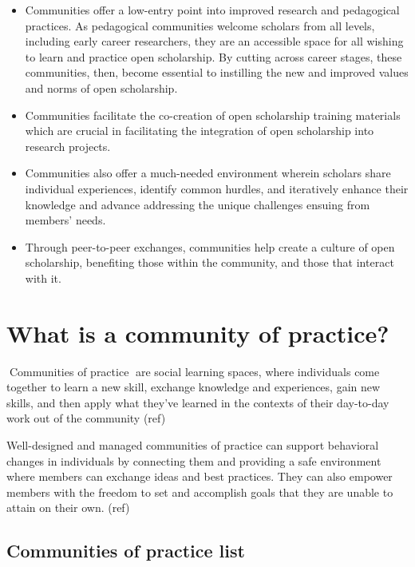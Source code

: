 \documentclass[
  letterpaper,
  DIV=11,
  numbers=noendperiod]{scrreport}
\providecommand{\tightlist}{%
  \setlength{\itemsep}{0pt}\setlength{\parskip}{0pt}}\usepackage{longtable,booktabs,array}
\begin{document}
\begin{itemize}
\tightlist
\item
  Communities offer a low-entry point into improved research and
  pedagogical practices. As pedagogical communities welcome scholars
  from all levels, including early career researchers, they are an
  accessible space for all wishing to learn and practice open
  scholarship. By cutting across career stages, these communities, then,
  become essential to instilling the new and improved values and norms
  of open scholarship.
\item
  Communities facilitate the co-creation of open scholarship training
  materials which are crucial in facilitating the integration of open
  scholarship into research projects.
\item
  Communities also offer a much-needed environment wherein scholars
  share individual experiences, identify common hurdles, and iteratively
  enhance their knowledge and advance addressing the unique challenges
  ensuing from members' needs.
\item
  Through peer-to-peer exchanges, communities help create a culture of
  open scholarship, benefiting those within the community, and those
  that interact with it.
\end{itemize}

\hypertarget{what-is-a-community-of-practice}{%
\section{What is a community of
practice?}\label{what-is-a-community-of-practice}}

{📖}Communities of practice{📖} are social learning spaces, where
individuals come together to learn a new skill, exchange knowledge and
experiences, gain new skills, and then apply what they've learned in the
contexts of their day-to-day work out of the community (ref)

Well-designed and managed communities of practice can support behavioral
changes in individuals by connecting them and providing a safe
environment where members can exchange ideas and best practices. They
can also empower members with the freedom to set and accomplish goals
that they are unable to attain on their own. (ref)

\hypertarget{communities-of-practice-list}{%
\subsection{Communities of practice
list}\label{communities-of-practice-list}}
\end{document}
